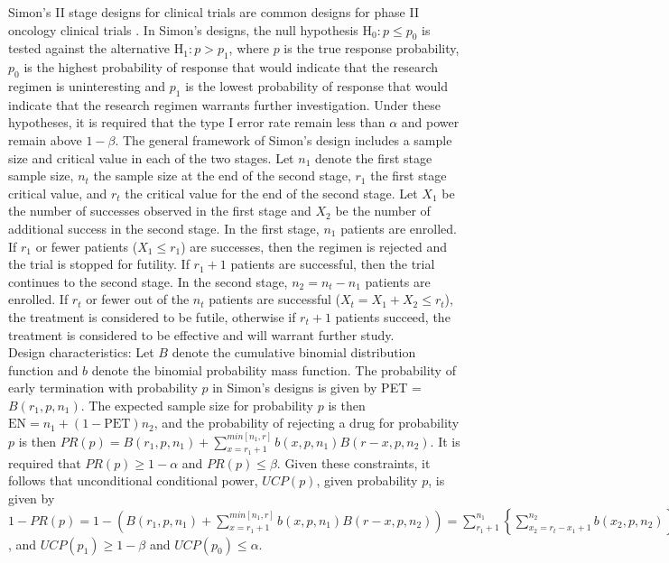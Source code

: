 \documentclass[12pt]{report}\usepackage[]{graphicx}\usepackage[]{color}
\newlength{\li}\setlength{\li}{14.48pt}
\newlength{\di}\setlength{\di}{-3.5mm}
\begin{document}
\indent Simon's II stage designs for clinical trials are common designs for phase II oncology clinical trials \cite{Simon}. In Simon's designs, the null hypothesis $\mbox{H}_0: p \leq p_0$ is tested against the alternative $\mbox{H}_1: p > p_1$, where $p$ is the true response probability, $p_0$ is the highest probability of response that would indicate that the research regimen is uninteresting and $p_1$ is the lowest probability of response that would indicate that the research regimen warrants further investigation. Under these hypotheses, it is required that the type I error rate remain less than $\alpha$ and power remain above $1-\beta$. The general framework of Simon's design includes a sample size and critical value in each of the two stages. Let $n_1$ denote the first stage sample size, $n_t$ the sample size at the end of the second stage, $r_1$ the first stage critical value, and $r_t$ the critical value for the end of the second stage. Let $X_1$ be the number of successes observed in the first stage and $X_2$ be the number of additional success in the second stage. In the first stage, $n_1$ patients are enrolled. If $r_1$ or fewer patients ($X_1 \leq r_1$) are successes, then the regimen is rejected and the trial is stopped for futility. If $r_1 + 1$ patients are successful, then the trial continues to the second stage. In the second stage, $n_2 = n_t - n_1$ patients are enrolled. If $r_t$ or fewer out of the $n_t$ patients are successful ($X_t = X_1 + X_2 \leq r_t$), the treatment is considered to be futile, otherwise if $r_t + 1$ patients succeed, the treatment is considered to be effective and will warrant further study.  \\
\indent Design characteristics: Let $B$ denote the cumulative binomial distribution function and $b$ denote the binomial probability mass function. The probability of early termination with probability $p$ in Simon's designs is given by PET = $B(r_1, p, n_1)$. The expected sample size for probability $p$ is then $\mbox{EN} = n_1 + (1-\mbox{PET})n_2$, and the probability of rejecting a drug for probability $p$ is then  $PR(p) = B(r_1, p, n_1) + \sum_{x=r_1+1}^{min[n_1,r]} b(x, p, n_1) B(r-x,p,n_2)$. It is required that $PR(p) \geq 1-\alpha$ and $PR(p) \leq \beta$. Given these constraints, it follows that unconditional conditional power, $UCP(p)$, given probability $p$, is given by $1-PR(p) = 1 - \left( B(r_1, p, n_1) + \sum_{x=r_1+1}^{min[n_1,r]} b(x, p, n_1) B(r-x,p,n_2) \right) = \sum_{r_1+1}^{n_1} \left\{\sum_{x_2 = r_t-x_1+1}^{n_2} b(x_2, p, n_2) \right\} b(x_1, p, n_1)$, and $UCP(p_1) \geq 1-\beta$ and $UCP(p_0) \leq \alpha$. \\
\end{document}
